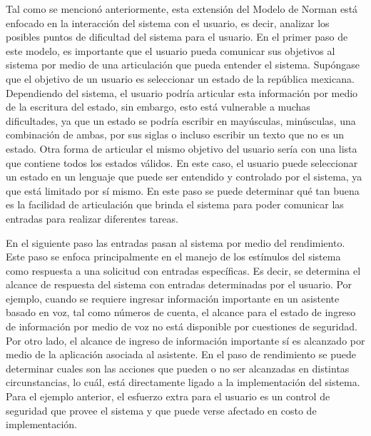 Tal como se mencionó anteriormente, esta extensión del Modelo de Norman está enfocado en la interacción del sistema con el usuario, es decir, analizar los posibles puntos de dificultad del sistema para el usuario. En el primer paso de este modelo, es importante que el usuario pueda comunicar sus objetivos al sistema por medio de una articulación que pueda entender el sistema. Supóngase que el objetivo de un usuario es seleccionar un estado de la república mexicana. Dependiendo del sistema, el usuario podría articular esta información por medio de la escritura del estado, sin embargo, esto está vulnerable a muchas dificultades, ya que un estado se podría escribir en mayúsculas, minúsculas, una combinación de ambas, por sus siglas o incluso escribir un texto que no es un estado. Otra forma de articular el mismo objetivo del usuario sería con una lista que contiene todos los estados válidos. En este caso, el usuario puede seleccionar un estado en un lenguaje que puede ser entendido y controlado por el sistema, ya que está limitado por sí mismo. En este paso se puede determinar qué tan buena es la facilidad de articulación que brinda el sistema para poder comunicar las entradas para realizar diferentes tareas.

En el siguiente paso las entradas pasan al sistema por medio del rendimiento. Este paso se enfoca principalmente en el manejo de los estímulos del sistema como respuesta a una solicitud con entradas específicas. Es decir, se determina el alcance de respuesta del sistema con entradas determinadas por el usuario. Por ejemplo, cuando se requiere ingresar información importante en un asistente basado en voz, tal como números de cuenta, el alcance para el estado de ingreso de información por medio de voz no está disponible por cuestiones de seguridad. Por otro lado, el alcance de ingreso de información importante sí es alcanzado por medio de la aplicación asociada al asistente. En el paso de rendimiento se puede determinar cuales son las acciones que pueden o no ser alcanzadas en distintas circunstancias, lo cuál, está directamente ligado a la implementación del sistema. Para el ejemplo anterior, el esfuerzo extra para el usuario es un control de seguridad que provee el sistema y que puede verse afectado en costo de implementación.

